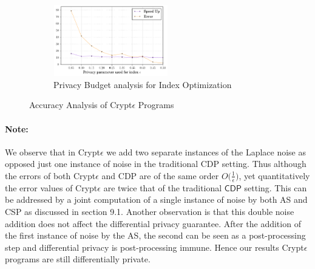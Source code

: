 \begin{figure}
\begin{subfigure}[b]{0.3\textwidth}
       \qquad \includegraphics[width=5cm,height=3.1cm]{index.pdf}
        \caption{Privacy Budget analysis for Index Optimization}
        \label{rangetree}
    \end{subfigure}
   \caption{Accuracy Analysis of Crypt$\epsilon$ Programs}
\end{figure}




\paragraph{\textbf{Note:}} We observe that in Crypt$\epsilon$ we add two separate instances of the Laplace noise as opposed just one instance of noise in the traditional \textsf{CDP} setting. Thus although the errors of both Crypt$\epsilon$ and \textsf{CDP} are of the same order $O\big(\frac{1}{\epsilon}\big)$, yet quantitatively the error values of Crypt$\epsilon$ are twice that of the traditional $\textsf{CDP}$ setting. This can be addressed by a joint computation of a single instance of noise by both \textsf{AS} and \textsf{CSP} as discussed in section 9.1. Another observation is that this double noise addition does not affect the differential privacy guarantee. After the addition of the first instance of noise by the \textsf{AS}, the second can be seen as a post-processing step and differential privacy is post-processing immune. Hence our results Crypt$\epsilon$ programs are still differentially private.


